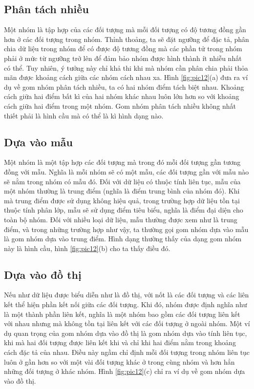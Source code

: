 \subsection{Phân tách nhiều}
Một nhóm là tập hợp của các đối tượng mà mỗi đối tượng có độ tương đồng gần hơn ở các đối tượng trong nhóm.
Thỉnh thoảng, ta sẽ đặt ngưỡng để đặc tả, phân chia dữ liệu trong nhóm để có được độ tương đồng mà các phần tử trong nhóm phải ở mức từ ngưỡng trở lên để đảm bảo nhóm được hình thành ít nhiễu nhất có thể.
Tuy nhiên, ý tưởng này chỉ khả thi khi mà nhóm cần phân chia phải thỏa mãn được khoảng cách giữa các nhóm cách nhau xa.
Hình \ref{fig:pic12}(a) đưa ra ví dụ về gom nhóm phân tách nhiều, ta có hai nhóm điểm tách biệt nhau.
Khoảng cách giữa hai điểm bất kì của hai nhóm khác nhau luôn lớn hơn so với khoảng cách giữa hai điểm trong một nhóm.
Gom nhóm phân tách nhiều không nhất thiết phải là hình cầu mà có thể là kì hình dạng nào.

\subsection{Dựa vào mẫu}
Một nhóm là một tập hợp các đối tượng mà trong đó mỗi đối tượng gần tương đồng với mẫu.
Nghĩa là mỗi nhóm sẽ có một mẫu, các đối tượng gần với mẫu nào sẽ nằm trong nhóm có mẫu đó.
Đối với dữ liệu có thuộc tính liên tục, mẫu của một nhóm thường là trung điểm (nghĩa là điểm trung bình của nhóm đó).
Khi mà trung điểm được sử dụng không hiệu quả, trong trường hợp dữ liệu tồn tại thuộc tính phân lớp, mẫu sẽ sử dụng điểm tiêu biểu, nghĩa là điểm đại diện cho toàn bộ nhóm.
Đối với nhiều loại dữ liệu, mẫu thường được xem như là trung điểm, và trong những trường hợp như vậy, ta thường gọi gom nhóm dựa vào mẫu là gom nhóm dựa vào trung điểm.
Hình dạng thường thấy của dạng gom nhóm này là hình cầu, hình \ref{fig:pic12}(b) cho ta thấy điều đó.

\subsection{Dựa vào đồ thị}
Nếu như dữ liệu được biểu diễn như là đồ thị, với nốt là các đối tượng và các liên kết thể hiện phần kết nối giữa các đối tượng.
Khi đó, nhóm được định nghĩa như là một thành phần liên kết, nghĩa là một nhóm bao gồm các đối tượng liên kết với nhau nhưng mà không tồn tại liên kết với các đối tượng ở ngoài nhóm.
Một ví dụ quan trọng của gom nhóm dựa vào đồ thị là gom nhóm dựa vào tính liên tục, khi mà hai đối tượng được liên kết khi và chỉ khi hai điểm nằm trong khoảng cách đặc tả của nhau.
Điều này ngầm chỉ định mỗi đối tượng trong nhóm liên tục luôn ở gần hơn so với một vài đối tượng khác ở trong cùng nhóm và hơn hẳn những đối tượng ở khác nhóm.
Hình \ref{fig:pic12}(c) chỉ ra ví dụ về gom nhóm dựa vào đồ thị.

